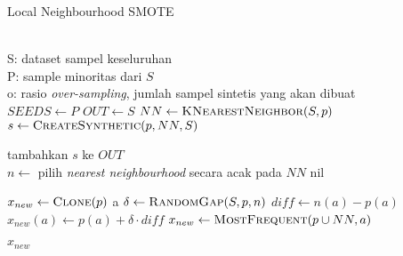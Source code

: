 \begin{algorithm}[h]
	\caption{Local Neighbourhood SMOTE}
	\label{alg:lnsmote}
	\begin{algorithmic}[1]
\Require \\
S: dataset sampel keseluruhan \\
P: sample minoritas dari $ S $ \\
o: rasio \textit{over-sampling}, jumlah sampel sintetis yang akan dibuat \\

	\State $ SEEDS \gets P $
	\State $ OUT \gets S $
		\State $ NN \gets \Call{KNearestNeighbor}{S, p} $
			\State $ s \gets \Call{CreateSynthetic}{p, NN, S} $

				\State tambahkan $ s $ ke $OUT$
			\EndIf
		\EndFor
	\EndFor
	\State {}
\EndFunction
\\
	\State $ n \gets $ pilih \textit{nearest neighbourhood} secara acak
	pada $ NN $
		\State \Return nil
	\EndIf

	\State $ x_{new} \gets \Call{Clone}{p} $
	a
			\State $ \delta \gets \Call{RandomGap}{S, p, n} $
			\State $ diff \gets n(a) - p(a) $
			\State $ x_{new}(a) \gets p(a) + \delta \cdot diff $
		\Else
			\State $ x_{new} \gets \Call{MostFrequent}{p \cup NN, a} $
		\EndIf
	\EndFor

	\State \Return $ x_{new} $
\EndFunction
	\end{algorithmic}
\end{algorithm}

